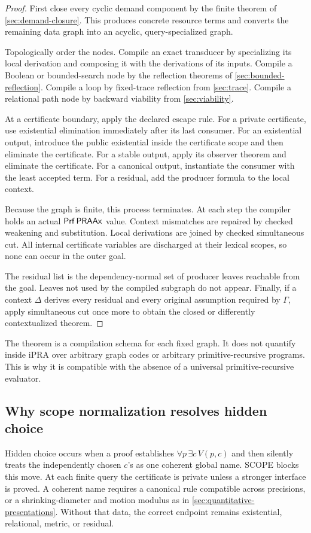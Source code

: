 \begin{proof}
First close every cyclic demand component by the finite theorem of \cref{sec:demand-closure}.  This produces concrete resource terms and converts the remaining data graph into an acyclic, query-specialized graph.

Topologically order the nodes.  Compile an exact transducer by specializing its local derivation and composing it with the derivations of its inputs.  Compile a Boolean or bounded-search node by the reflection theorems of \cref{sec:bounded-reflection}.  Compile a loop by fixed-trace reflection from \cref{sec:trace}.  Compile a relational path node by backward viability from \cref{sec:viability}.

At a certificate boundary, apply the declared escape rule.  For a private certificate, use existential elimination immediately after its last consumer.  For an existential output, introduce the public existential inside the certificate scope and then eliminate the certificate.  For a stable output, apply its observer theorem and eliminate the certificate.  For a canonical output, instantiate the consumer with the least accepted term.  For a residual, add the producer formula to the local context.

Because the graph is finite, this process terminates.  At each step the compiler holds an actual \(\mathsf{Prf}\,\mathsf{PRAAx}\) value.  Context mismatches are repaired by checked weakening and substitution.  Local derivations are joined by checked simultaneous cut.  All internal certificate variables are discharged at their lexical scopes, so none can occur in the outer goal.

The residual list is the dependency-normal set of producer leaves reachable from the goal.  Leaves not used by the compiled subgraph do not appear.  Finally, if a context \(\Delta\) derives every residual and every original assumption required by \(\Gamma\), apply simultaneous cut once more to obtain the closed or differently contextualized theorem.
\end{proof}

\begin{remark}
The theorem is a compilation schema for each fixed graph.  It does not quantify inside iPRA over arbitrary graph codes or arbitrary primitive-recursive programs.  This is why it is compatible with the absence of a universal primitive-recursive evaluator.
\end{remark}

\subsection{Why scope normalization resolves hidden choice}

Hidden choice occurs when a proof establishes \(\forall p\,\exists c\,V(p,c)\) and then silently treats the independently chosen \(c\)'s as one coherent global name.  SCOPE blocks this move.  At each finite query the certificate is private unless a stronger interface is proved.  A coherent name requires a canonical rule compatible across precisions, or a shrinking-diameter and motion modulus as in \cref{sec:quantitative-presentations}.  Without that data, the correct endpoint remains existential, relational, metric, or residual.
